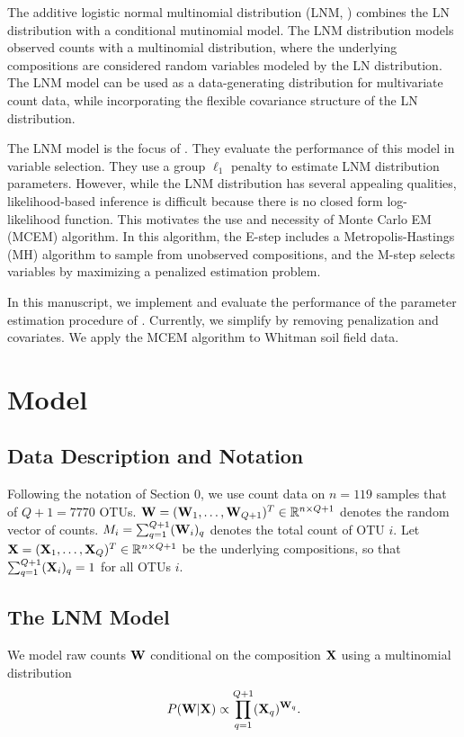 \documentclass{template}
\begin{document}
The additive logistic normal multinomial distribution (LNM, \cite{billheimer2001statistical}) combines the LN distribution with a conditional mutinomial model. The LNM distribution models observed counts with a multinomial distribution, where the underlying compositions are considered random variables modeled by the LN distribution. The LNM model can be used as a data-generating distribution for multivariate count data, while incorporating the flexible covariance structure of the LN distribution. 

The LNM model is the focus of  \cite{xia2013logistic}. They evaluate the performance of this model in variable selection. They use a group $\ell_1$ penalty to estimate LNM distribution parameters. However, while the LNM distribution has several appealing qualities, likelihood-based inference is difficult because there is no closed form log-likelihood function. This motivates the use and necessity of Monte Carlo EM (MCEM) algorithm. In this algorithm, the E-step includes a  Metropolis-Hastings (MH) algorithm to sample from unobserved compositions, and the M-step selects variables by maximizing a penalized estimation problem.

In this manuscript, we implement and evaluate the performance of the parameter estimation procedure of \cite{xia2013logistic}. Currently, we simplify by removing penalization and covariates. We apply the MCEM algorithm to Whitman soil field data.


\section{Model}
\subsection{Data Description and Notation}
Following the notation of Section 0, we use count data on $n=119$ samples that of $Q+1=7770$ OTUs. $\mathbf{W}=(\mathbf{W}_1,\ldots,\mathbf{W}_{Q+1})^T\in\mathbb{R}^{n\times Q+1}$ denotes the random vector of counts. $M_i=\sum_{q=1}^{Q+1} (\mathbf{W}_i)_q$ denotes the total count of OTU $i$. Let $\mathbf{X}=(\mathbf{X}_1,\ldots,\mathbf{X}_{Q})^T\in\mathbb{R}^{n\times Q+1}$ be the underlying compositions, so that $\sum_{q=1}^{Q+1} (\mathbf{X}_{i})_q=1$ for all OTUs $i$.

\subsection{The LNM Model}
We model raw counts $\mathbf{W}$ conditional on the composition $\mathbf{X}$ using a multinomial distribution
$$P(\mathbf{W}|\mathbf{X})\propto \prod_{q=1}^{Q+1} (\mathbf{X}_q)^{\mathbf{W}_q}.$$
\end{document}
